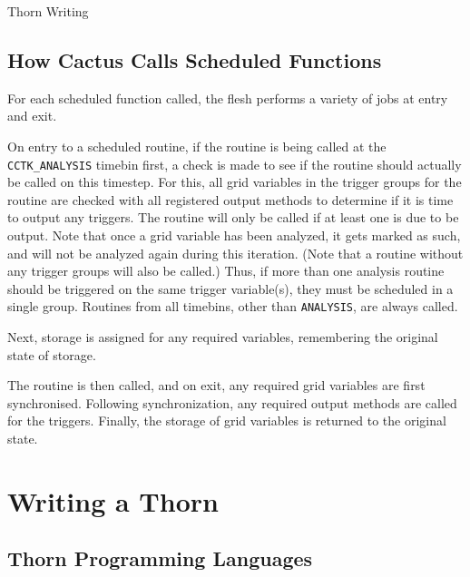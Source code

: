 \begin{cactuspart}{Thorn Writing}

\subsection{How Cactus Calls Scheduled Functions}
\label{scheduling:calling_scheduled_functions}

For each scheduled function called, the flesh performs a variety of jobs
at entry and exit.

On entry to a scheduled routine, if the routine is being called at the
\texttt{CCTK\_ANALYSIS} timebin first, a check is made to see if the routine should
actually be called on this timestep. For this, all grid variables in the
trigger groups for the routine are checked with all registered output
methods to determine if it is time to output any triggers. The routine
will only be called if at least one is due to be output. Note that once
a grid variable has been analyzed, it gets marked as such, and will not
be analyzed again during this iteration.
(Note that a routine without any trigger groups will also be called.)
Thus, if more than one analysis
routine should be triggered on the same trigger variable(s), they must
be scheduled in a single group. Routines from all timebins, other than \texttt{ANALYSIS}, are always called.

Next, storage is assigned for any required variables, remembering the
original state of storage.

The routine is then called, and on exit, any required grid variables are
first synchronised. Following synchronization, any required output methods
are called for the triggers. Finally, the storage of grid variables is
returned to the original state.


\section{Writing a Thorn}


\subsection{Thorn Programming Languages}


\end{cactuspart}
